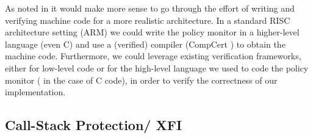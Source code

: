 As noted in \cite{pump_popl2015} it would make more sense to go
through the effort of writing and verifying machine code for a more
realistic architecture.  In a standard RISC architecture setting
(\EG ARM) we could write the policy monitor in a higher-level
language (even C) and use a (verified) compiler (\EG CompCert
\cite{leroy09:compcert}) to obtain the machine code. Furthermore, we
could leverage existing verification frameworks, either for low-level
code \cite{Chlipala2013,JensenBK13} or for the high-level language we
used to code the policy monitor (\EG
\cite{Appel:2011:VST:1987211.1987212} in the case of C code), in order
to verify the correctness of our implementation.



\subsection{Call-Stack Protection/ XFI}
